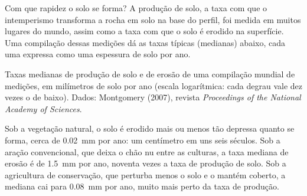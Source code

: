 Com que rapidez o solo se forma? A produção de solo, a taxa com que o
intemperismo transforma a rocha em solo na base do perfil, foi medida em
muitos lugares do mundo, assim como a taxa com que o solo é erodido na
superfície. Uma compilação dessas medições dá as taxas típicas (medianas)
abaixo, cada uma expressa como uma espessura de solo por ano.

\begin{omfigure}

{\small Taxas medianas de produção de solo e de erosão de uma compilação
mundial de medições, em milímetros de solo por ano (escala logarítmica: cada
degrau vale dez vezes o de baixo). Dados: Montgomery
(2007), revista \emph{Proceedings of the National Academy of Sciences}.}
\end{omfigure}

Sob a vegetação natural, o solo é erodido mais ou menos tão depressa quanto
se forma, cerca de \qty{0.02}{mm} por ano: um centímetro em uns seis séculos.
Sob a aração convencional, que deixa o chão nu entre as culturas, a taxa
mediana de erosão é de \qty{1.5}{mm} por ano, noventa vezes a taxa de
produção de solo. Sob a agricultura de conservação, que perturba menos o
solo e o mantém coberto, a mediana cai para \qty{0.08}{mm} por ano, muito
mais perto da taxa de produção.

